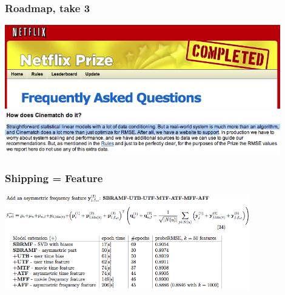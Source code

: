 \documentclass[xcolor=dvipsnames, 9pt]{beamer}
\begin{document}
\begin{frame}
  \frametitle{Roadmap, take 3}

    \begin{center}
      \includegraphics[width=0.9\textwidth]{netflix_faq.png}
      \includegraphics[width=0.9\textwidth]{netflix_cinematch.png}
    \end{center}

\end{frame}


\begin{frame}
  \frametitle{Shipping = Feature}

    \begin{center}
      \includegraphics[width=0.8\textwidth]{netflix_solution.png}
    \end{center}

\end{frame}
\end{document}
